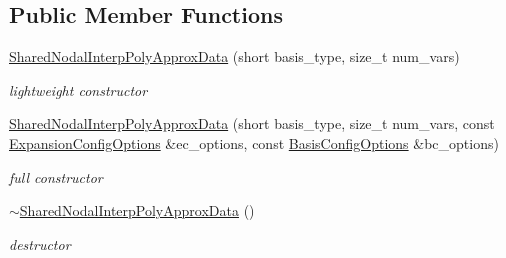 \subsection*{Public Member Functions}
\begin{DoxyCompactItemize}
\item 
\hyperlink{classPecos_1_1SharedNodalInterpPolyApproxData_a227242517d3621c03cd2940593de17d8}{Shared\+Nodal\+Interp\+Poly\+Approx\+Data} (short basis\+\_\+type, size\+\_\+t num\+\_\+vars)\label{classPecos_1_1SharedNodalInterpPolyApproxData_a227242517d3621c03cd2940593de17d8}

\begin{DoxyCompactList}\small\item\em lightweight constructor \end{DoxyCompactList}\item 
\hyperlink{classPecos_1_1SharedNodalInterpPolyApproxData_a7b94950e7e50b607092b9c76968389c9}{Shared\+Nodal\+Interp\+Poly\+Approx\+Data} (short basis\+\_\+type, size\+\_\+t num\+\_\+vars, const \hyperlink{classPecos_1_1ExpansionConfigOptions}{Expansion\+Config\+Options} \&ec\+\_\+options, const \hyperlink{classPecos_1_1BasisConfigOptions}{Basis\+Config\+Options} \&bc\+\_\+options)\label{classPecos_1_1SharedNodalInterpPolyApproxData_a7b94950e7e50b607092b9c76968389c9}

\begin{DoxyCompactList}\small\item\em full constructor \end{DoxyCompactList}\item 
\hyperlink{classPecos_1_1SharedNodalInterpPolyApproxData_ae907af83c83b0b7f24c897de82cf7956}{$\sim$\+Shared\+Nodal\+Interp\+Poly\+Approx\+Data} ()\label{classPecos_1_1SharedNodalInterpPolyApproxData_ae907af83c83b0b7f24c897de82cf7956}

\begin{DoxyCompactList}\small\item\em destructor \end{DoxyCompactList}\end{DoxyCompactItemize}
